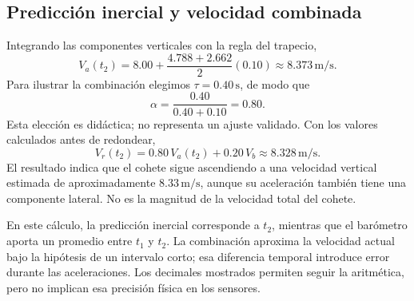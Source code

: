 \subsection{Predicción inercial y velocidad combinada}
Integrando las componentes verticales con la regla del trapecio,
\begin{equation}
 V_a(t_2)=8.00+\frac{4.788+2.662}{2}(0.10)
 \approx8.373\,\mathrm{m/s}.
\end{equation}
Para ilustrar la combinación elegimos $\tau=0.40\,\mathrm{s}$, de modo que
\begin{equation}
 \alpha=\frac{0.40}{0.40+0.10}=0.80.
\end{equation}
Esta elección es didáctica; no representa un ajuste validado. Con los valores calculados antes de redondear,
\begin{equation}
 V_r(t_2)=0.80\,V_a(t_2)+0.20\,V_b
 \approx\boxed{8.328\,\mathrm{m/s}}.
\end{equation}
El resultado indica que el cohete sigue ascendiendo a una velocidad vertical estimada de aproximadamente $8.33\,\mathrm{m/s}$, aunque su aceleración también tiene una componente lateral. No es la magnitud de la velocidad total del cohete.

En este cálculo, la predicción inercial corresponde a $t_2$, mientras que el barómetro aporta un promedio entre $t_1$ y $t_2$. La combinación aproxima la velocidad actual bajo la hipótesis de un intervalo corto; esa diferencia temporal introduce error durante las aceleraciones. Los decimales mostrados permiten seguir la aritmética, pero no implican esa precisión física en los sensores.

